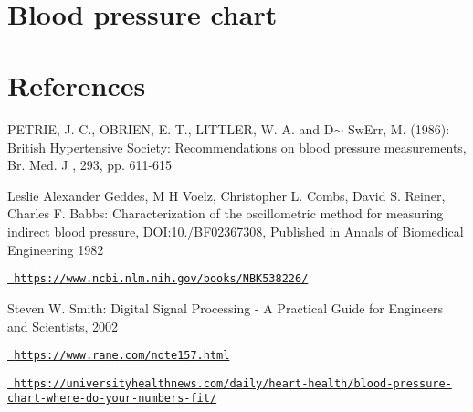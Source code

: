 ~\newline
\hypertarget{index_chart}{}\section{Blood pressure chart}\label{index_chart}
\hypertarget{index_references}{}\section{References}\label{index_references}

\begin{DoxyEnumerate}
\item P\+E\+T\+R\+IE, J. C., O\textquotesingle{}B\+R\+I\+EN, E. T., L\+I\+T\+T\+L\+ER, W. A. and D$\sim$ Sw\+Err, M. (1986)\+: \textquotesingle{}British Hypertensive Society\+: Recommendations on blood pressure measurements\textquotesingle{}, Br. Med. J , 293, pp. 611-\/615
\item Leslie Alexander Geddes, M H Voelz, Christopher L. Combs, David S. Reiner, Charles F. Babbs\+: Characterization of the oscillometric method for measuring indirect blood pressure, D\+OI\+:10./\+B\+F02367308, Published in Annals of Biomedical Engineering 1982
\item \href{https://www.ncbi.nlm.nih.gov/books/NBK538226/}{\texttt{ https\+://www.\+ncbi.\+nlm.\+nih.\+gov/books/\+N\+B\+K538226/}}
\item Steven W. Smith\+: Digital Signal Processing -\/ A Practical Guide for Engineers and Scientists, 2002
\item \href{https://www.rane.com/note157.html}{\texttt{ https\+://www.\+rane.\+com/note157.\+html}}
\item \href{https://universityhealthnews.com/daily/heart-health/blood-pressure-chart-where-do-your-numbers-fit/}{\texttt{ https\+://universityhealthnews.\+com/daily/heart-\/health/blood-\/pressure-\/chart-\/where-\/do-\/your-\/numbers-\/fit/}} 
\end{DoxyEnumerate}